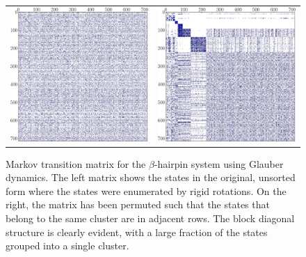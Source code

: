 \begin{figure}[tb]
  \begin{center}
    \begin{tabular}{c c}
      \includegraphics[width=.35\textwidth]{supplement/beta_cluster_example_2/pictures/markov_matrix_unpermuted.pdf}
      &
      \includegraphics[width=.35\textwidth]{supplement/beta_cluster_example_2/pictures/markov_matrix_permuted.pdf}
    \end{tabular}
  \end{center}
  \caption{Markov transition matrix for the $\beta$-hairpin system using Glauber dynamics. The left matrix shows the states in the original, unsorted form where the states were enumerated by rigid rotations. On the right, the matrix has been permuted such that the states that belong to the same cluster are in adjacent rows. The block diagonal structure is clearly evident, with a large fraction of the states grouped into a single cluster. }
  \label{fig:Rate_Matrix_Permutations}
\end{figure}

